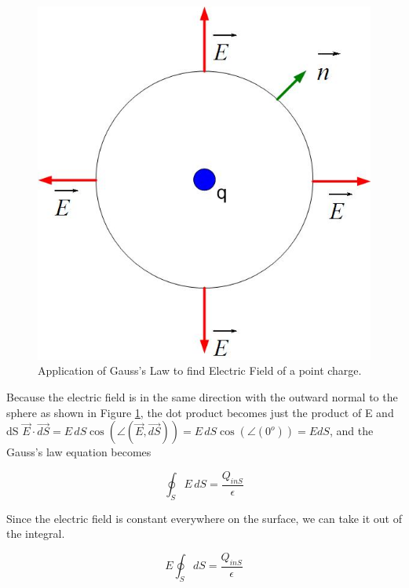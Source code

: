 \documentclass{ximera}
\begin{document}
\begin{figure}[!ht]
\begin{center}
\includegraphics[scale=0.5]{../jpg/unitchargefield.jpg}
\end{center}
\caption{Application of Gauss's Law to find Electric Field of a point charge.}
\label{fig:gaussPoint}
\end{figure}

Because the electric field is in the same direction with the outward normal to the sphere as shown in Figure \ref{fig:gaussPoint}, the dot product becomes just the product of E and dS $\vec{E} \cdot \vec{dS}= E \,dS  \cos(\angle(\vec{E},\vec{dS}))= E \,dS  \cos(\angle(0^o)) =E dS$, and the Gauss's law equation becomes 



\begin{equation}
\oint_S E \,dS  = \frac{Q_{inS}}{\epsilon}
\end{equation}

Since the electric field is constant everywhere on the surface, we can take it out of the integral. 


\begin{equation}
 E \oint_S dS = \frac{Q_{inS}}{\epsilon}
\end{equation}
\end{document}

